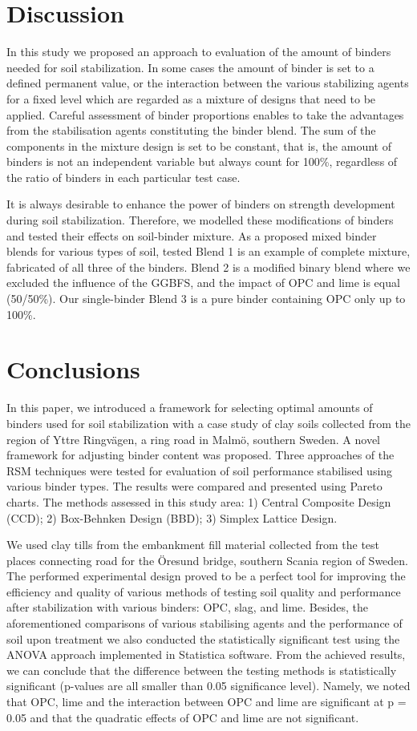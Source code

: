 \documentclass[eprint,
]{actapoly}
\begin{document}
\section{Discussion}
In this study we proposed an approach to evaluation of the amount of binders needed for soil stabilization. In some cases the amount of binder is set to a defined permanent value, or the interaction between the various stabilizing agents for a fixed level which are regarded as a mixture of designs that need to be applied. Careful assessment of binder proportions enables to take the advantages from the stabilisation agents constituting the binder blend. The sum of the components in the mixture design is set to be constant, that is, the amount of binders is not an independent variable but always count for 100\%, regardless of the ratio of binders in each particular test case. 

It is always desirable to enhance the power of binders on strength development during soil stabilization. Therefore, we modelled these modifications of binders and tested their effects on soil-binder mixture. As a proposed mixed binder blends for various types of soil, tested Blend 1 is an example of complete mixture, fabricated of all three of the binders. Blend 2 is a modified binary blend where we excluded the influence of the GGBFS, and the impact of OPC and lime is equal (50/50\%). Our single-binder Blend 3 is a pure binder containing OPC only up to 100\%. 

\section{Conclusions}
In this paper, we introduced a framework for selecting optimal amounts of binders used for soil stabilization with a case study of clay soils collected from the region of Yttre Ringvägen, a ring road in Malmö, southern Sweden. A novel framework for adjusting binder content was proposed. Three approaches of the RSM techniques were tested for evaluation of soil performance stabilised using various binder types. The results were compared and presented using Pareto charts. The methods assessed in this study area: 1) Central Composite Design (CCD); 2) Box-Behnken Design (BBD); 3) Simplex Lattice Design. 

We used clay tills from the embankment fill material collected from the test places connecting road for the Öresund bridge, southern Scania region of Sweden. The performed experimental design proved to be a perfect tool for improving the efficiency and quality of various methods of testing soil quality and performance after stabilization with various binders: OPC, slag, and lime. Besides, the aforementioned comparisons of various stabilising agents and the performance of soil upon treatment we also conducted the statistically significant test using the ANOVA approach implemented in Statistica software. From the achieved results, we can conclude that the difference between the testing methods is statistically significant (p-values are all smaller than 0.05 significance level). Namely, we noted that OPC, lime and the interaction between OPC and lime are significant at p = 0.05 and that the quadratic effects of OPC and lime are not significant.
\end{document}
